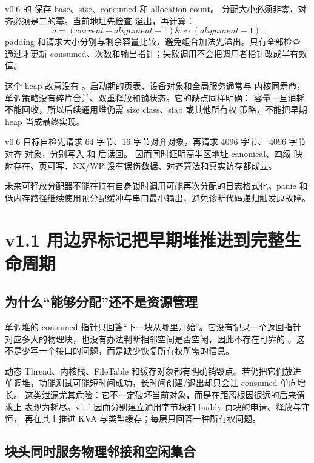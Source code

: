 v0.6 的  保存 base、size、consumed 和 allocation count。
分配大小必须非零，对齐必须是二的幂。当前地址先检查
 溢出，再计算：
\[
  a=(current+alignment-1)\mathbin{\&}\sim(alignment-1).
\]
padding 和请求大小分别与剩余容量比较，避免组合加法先溢出。只有全部检查
通过才更新 consumed、次数和输出指针；失败调用不会把调用者指针改成半有效值。

这个 heap 故意没有 。启动期的页表、设备对象和全局服务通常与
内核同寿命，单调策略没有碎片合并、双重释放和锁状态。它的缺点同样明确：
容量一旦消耗不能回收，所以后续通用堆仍需 size class、slab 或其他所有权
策略，不能把早期 heap 当成最终实现。

v0.6 目标自检先请求 64 字节、16 字节对齐对象，再请求 4096 字节、
4096 字节对齐
对象，分别写入
 和  后读回。
 因而同时证明高半区地址 canonical、四级
映射存在、页可写、NX/WP 没有误伤数据、对齐算法和真实访存都成立。

未来可释放分配器不能在持有自身锁时调用可能再次分配的日志格式化。panic 和
低内存路径继续使用预分配缓冲与串口最小输出，避免诊断代码递归触发原故障。

\section{v1.1 用边界标记把早期堆推进到完整生命周期}

\subsection{为什么“能够分配”还不是资源管理}

单调堆的 consumed 指针只回答“下一块从哪里开始”。它没有记录一个返回指针
对应多大的物理块，也没有办法判断相邻空间是否空闲，因此不存在可靠的
。这不是少写一个接口的问题，而是缺少恢复所有权所需的信息。

动态 Thread、内核栈、FileTable 和缓存对象都有明确销毁点。若仍把它们放进
单调堆，功能测试可能短时间成功，长时间创建/退出却只会让 consumed 单向增长。
这类泄漏尤其危险：它不一定破坏当前对象，而是在距离根因很远的后来请求上
表现为耗尽。v1.1 因而分别建立通用字节块和 buddy 页块的申请、释放与守恒，
再在其上推进 KVA 与类型缓存；每层只回答一种所有权问题。

\subsection{块头同时服务物理邻接和空闲集合}

